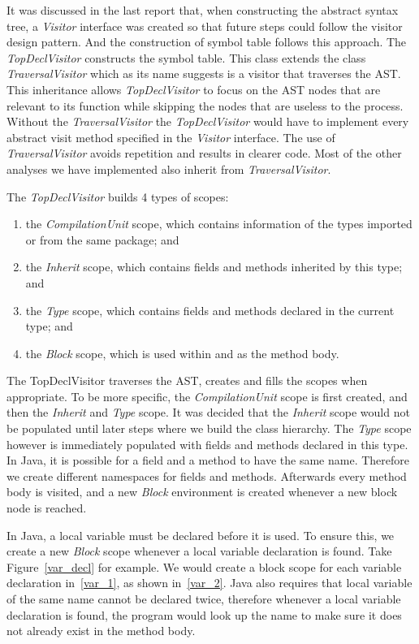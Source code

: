 \documentclass[a4paper, notitlepage]{report}
\begin{document}
It was discussed in the last report that, when constructing the abstract syntax tree, a \emph{Visitor} interface was created so that future steps could follow the visitor design pattern. And the construction of symbol table follows this approach. The \emph{TopDeclVisitor} constructs the symbol table. This class extends the class \emph{TraversalVisitor} which as its name suggests is a visitor that traverses the AST. This inheritance allows \emph{TopDeclVisitor} to focus on the AST nodes that are relevant to its function while skipping the nodes that are useless to the process. Without the \emph{TraversalVisitor} the \emph{TopDeclVisitor} would have to implement every abstract visit method specified in the \emph{Visitor} interface. The use of \emph{TraversalVisitor} avoids repetition and results in clearer code. Most of the other analyses we have implemented also inherit from \emph{TraversalVisitor}.

The \emph{TopDeclVisitor} builds 4 types of scopes: 
\begin{enumerate}
\item the \emph{CompilationUnit} scope, which contains information of the types imported or from the same package; and
\item the \emph{Inherit} scope, which contains fields and methods inherited by this type; and
\item the \emph{Type} scope, which contains fields and methods declared in the current type; and
\item the \emph{Block} scope, which is used within and as the method body.

\end{enumerate}

The TopDeclVisitor traverses the AST, creates and fills the scopes when appropriate. To be more specific, the \emph{CompilationUnit} scope is first created, and then the \emph{Inherit} and \emph{Type} scope. It was decided that the \emph{Inherit} scope would not be populated until later steps where we build the class hierarchy. The \emph{Type} scope however is immediately populated with fields and methods declared in this type. In Java, it is possible for a field and a method to have the same name. Therefore we create different namespaces for fields and methods. Afterwards every method body is visited, and a new \emph{Block} environment is created whenever a new block node is reached. 

In Java, a local variable must be declared before it is used. To ensure this, we create a new \emph{Block} scope whenever a local variable declaration is found. Take Figure~\ref{var_decl} for example. We would create a block scope for each variable declaration in~\ref{var_1}, as shown in~\ref{var_2}. 
Java also requires that local variable of the same name cannot be declared twice, therefore whenever a local variable declaration is found, the program would look up the name to make sure it does not already exist in the method body.
\end{document}
